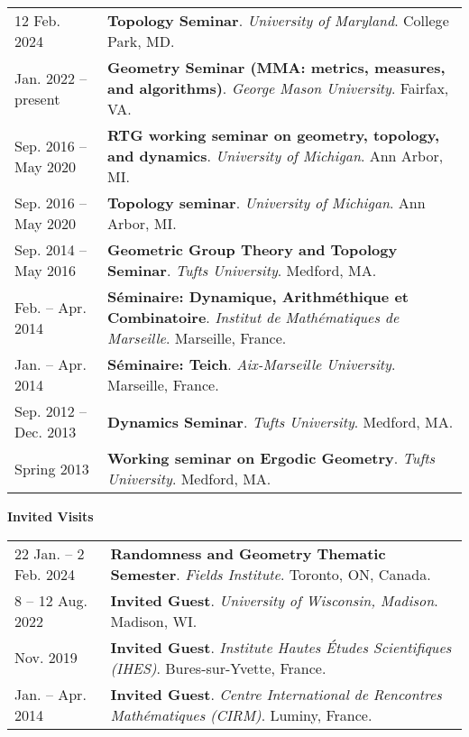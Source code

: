     \begin{center}
    {
    \renewcommand{\arraystretch}{1.5}
    \begin{longtable}{p{}  p{}}
    12 Feb.  2024 & \textbf{Topology Seminar}. \textit{University of Maryland}.  College Park, MD.  \\ 
 Jan.  2022 -- present & \textbf{Geometry Seminar (MMA: metrics, measures, and algorithms)}. \textit{George Mason University}.  Fairfax, VA.  \\ 
 Sep.  2016 --  May  2020 & \textbf{RTG working seminar on geometry, topology, and dynamics}. \textit{University of Michigan}.  Ann Arbor, MI.  \\ 
 Sep.  2016 --  May  2020 & \textbf{Topology seminar}. \textit{University of Michigan}.  Ann Arbor, MI.  \\ 
 Sep.  2014 --  May  2016 & \textbf{Geometric Group Theory and Topology Seminar}. \textit{Tufts University}.  Medford, MA.  \\ 
 Feb.  --  Apr.  2014 & \textbf{S\'eminaire: Dynamique, Arithm\'ethique et Combinatoire}. \textit{Institut de Math\'ematiques de Marseille}.  Marseille, France.  \\ 
 Jan.  --  Apr.  2014 & \textbf{S\'eminaire: Teich}. \textit{Aix-Marseille University}.  Marseille, France.  \\ 
 Sep.  2012 --  Dec.  2013 & \textbf{Dynamics Seminar}. \textit{Tufts University}.  Medford, MA.  \\ 
  Spring 2013 & \textbf{Working seminar on Ergodic Geometry}. \textit{Tufts University}.  Medford, MA.  
    \end{longtable}
    } 
    \end{center}

    \vspace{-1em}
    

    \textbf{\large Invited Visits}
    
    \begin{center}
    {
    \renewcommand{\arraystretch}{1.5}
    \begin{longtable}{p{}  p{}}
    22 Jan.  -- 2 Feb.  2024 & \textbf{Randomness and Geometry Thematic Semester}. \textit{Fields Institute}.  Toronto, ON, Canada.  \\ 
8  -- 12 Aug.  2022 & \textbf{Invited Guest}. \textit{University of Wisconsin, Madison}.  Madison, WI.  \\ 
 Nov.  2019 & \textbf{Invited Guest}. \textit{Institute Hautes \'Etudes Scientifiques (IHES)}.  Bures-sur-Yvette, France.  \\ 
 Jan.  --  Apr.  2014 & \textbf{Invited Guest}. \textit{Centre International de Rencontres Math\'ematiques (CIRM)}.  Luminy, France.  
    \end{longtable}
    } 
    \end{center}

    \vspace{-1em}
    